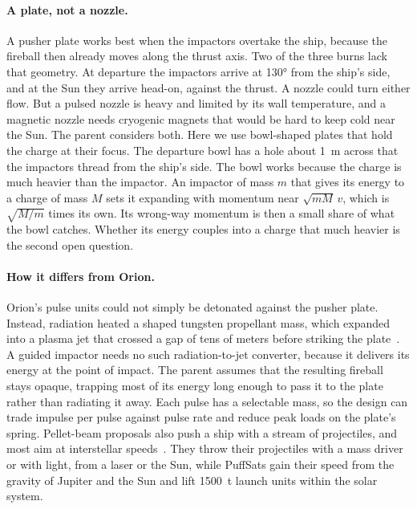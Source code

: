 \documentclass{article}
\begin{document}
\paragraph{A plate, not a nozzle.} A pusher plate works best when the impactors overtake the ship, because the fireball then already moves along the thrust axis. Two of the three burns lack that geometry. At departure the impactors arrive at \ang{130} from the ship's side, and at the Sun they arrive head-on, against the thrust. A nozzle could turn either flow. But a pulsed nozzle is heavy and limited by its wall temperature, and a magnetic nozzle needs cryogenic magnets that would be hard to keep cold near the Sun. The parent considers both. Here we use bowl-shaped plates that hold the charge at their focus. The departure bowl has a hole about \SI{1}{\meter} across that the impactors thread from the ship's side. The bowl works because the charge is much heavier than the impactor. An impactor of mass $m$ that gives its energy to a charge of mass $M$ sets it expanding with momentum near $\sqrt{mM}\,v$, which is $\sqrt{M/m}$ times its own. Its wrong-way momentum is then a small share of what the bowl catches. Whether its energy couples into a charge that much heavier is the second open question.

\paragraph{How it differs from Orion.} Orion's pulse units could not simply be detonated against the pusher plate. Instead, radiation heated a shaped tungsten propellant mass, which expanded into a plasma jet that crossed a gap of tens of meters before striking the plate~\cite{balcomb1970nuclear,dyson2002project_orion}. A guided impactor needs no such radiation-to-jet converter, because it delivers its energy at the point of impact. The parent assumes that the resulting fireball stays opaque, trapping most of its energy long enough to pass it to the plate rather than radiating it away. Each pulse has a selectable mass, so the design can trade impulse per pulse against pulse rate and reduce peak loads on the plate's spring. Pellet-beam proposals also push a ship with a stream of projectiles, and most aim at interstellar speeds~\cite{singer1979interstellar,willis1994momentum,nordley2001interstellar,kare2001sailbeam,davoyan2023pelletbeam,nordley2015massbeam}. They throw their projectiles with a mass driver or with light, from a laser or the Sun, while PuffSats gain their speed from the gravity of Jupiter and the Sun and lift \SI{1500}{\tonne} launch units within the solar system.
\end{document}

